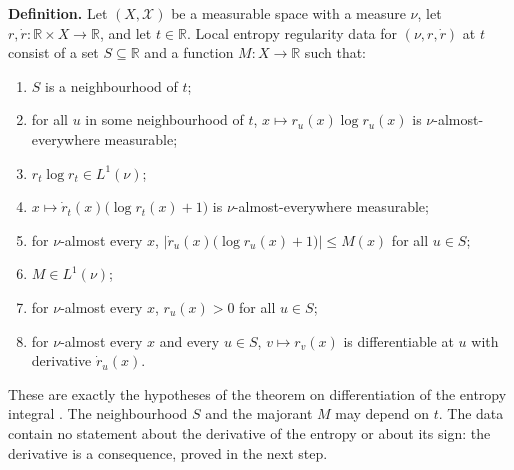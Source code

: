 \documentclass[11pt,a4paper]{article}
\begin{document}
\textbf{Definition.} Let \((X,\mathcal X)\) be a measurable space with a measure \(\nu\), let \(r,\dot r:\mathbb R\times X\to\mathbb R\), and let \(t\in\mathbb R\). Local entropy regularity data for \((\nu,r,\dot r)\) at \(t\) consist of a set \(S\subseteq\mathbb R\) and a function \(M:X\to\mathbb R\) such that:



\begin{enumerate}


\item \(S\) is a neighbourhood of \(t\);

\item for all \(u\) in some neighbourhood of \(t\), \(x\mapsto r_u(x)\log r_u(x)\) is \(\nu\)-almost-everywhere measurable;

\item \(r_t\log r_t\in L^1(\nu)\);

\item \(x\mapsto\dot r_t(x)\bigl(\log r_t(x)+1\bigr)\) is \(\nu\)-almost-everywhere measurable;

\item for \(\nu\)-almost every \(x\), \(\bigl|\dot r_u(x)\bigl(\log r_u(x)+1\bigr)\bigr|\le M(x)\) for all \(u\in S\);

\item \(M\in L^1(\nu)\);

\item for \(\nu\)-almost every \(x\), \(r_u(x)>0\) for all \(u\in S\);

\item for \(\nu\)-almost every \(x\) and every \(u\in S\), \(v\mapsto r_v(x)\) is differentiable at \(u\) with derivative \(\dot r_u(x)\).

\end{enumerate}



These are exactly the hypotheses of the theorem on differentiation of the entropy integral \cite[Section~3.31.2]{LangevinLean2026ULALSI}. The neighbourhood \(S\) and the majorant \(M\) may depend on \(t\). The data contain no statement about the derivative of the entropy or about its sign: the derivative is a consequence, proved in the next step.
\end{document}
